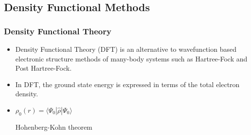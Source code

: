 \documentclass[slidestop,mathserif,compress,xcolor=svgnames]{beamer}
\begin{document}
\subsection{Density Functional Methods}
\begin{frame}
  \frametitle{\small Density Functional Theory}
    \begin{itemize}
      \item Density Functional Theory (DFT) is an alternative to wavefunction based electronic structure methods of many-body systems such as Hartree-Fock and Post Hartree-Fock.
      \item In DFT, the ground state energy is expressed in terms of the total electron density.
      \item[]{\hspace{4cm}$\rho_0(r) = \langle\Psi_0|\hat{\rho}|\Psi_0\rangle$}
      \begin{block}{Hohenberg-Kohn theorem}
      \end{block}
    \end{itemize}
\end{frame}
\end{document}
